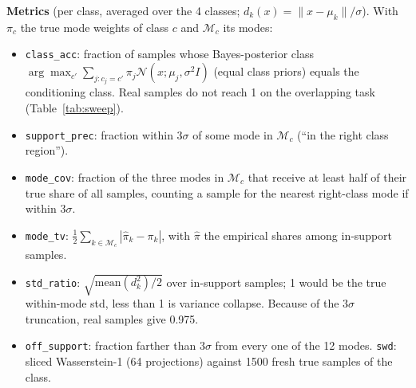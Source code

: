 \textbf{Metrics} (per class, averaged over the 4 classes; $d_k(x)=\|x-\mu_k\|/\sigma$). With $\pi_c$ the true mode weights of class $c$ and $\mathcal M_c$ its modes:
\begin{itemize}
\item \texttt{class\_acc}: fraction of samples whose Bayes-posterior class $\arg\max_{c'}\sum_{j:c_j=c'}\pi_j\mathcal N(x;\mu_j,\sigma^2I)$ (equal class priors) equals the conditioning class. Real samples do not reach 1 on the overlapping task (Table~\ref{tab:sweep}).
\item \texttt{support\_prec}: fraction within $3\sigma$ of some mode in $\mathcal M_c$ (``in the right class region'').
\item \texttt{mode\_cov}: fraction of the three modes in $\mathcal M_c$ that receive at least half of their true share of all samples, counting a sample for the nearest right-class mode if within $3\sigma$.
\item \texttt{mode\_tv}: $\frac12\sum_{k\in\mathcal M_c}|\hat\pi_k-\pi_k|$, with $\hat\pi$ the empirical shares among in-support samples.
\item \texttt{std\_ratio}: $\sqrt{\mathrm{mean}(d_k^2)/2}$ over in-support samples; 1 would be the true within-mode std, less than 1 is variance collapse. Because of the $3\sigma$ truncation, real samples give 0.975.
\item \texttt{off\_support}: fraction farther than $3\sigma$ from every one of the 12 modes. \texttt{swd}: sliced Wasserstein-1 (64 projections) against 1500 fresh true samples of the class.
\end{itemize}
